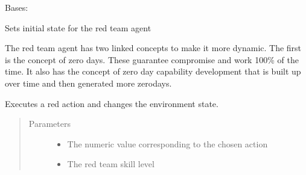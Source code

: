 \documentclass[letterpaper,10pt,english]{sphinxmanual}
\begin{document}
\begin{fulllineitems}
\label{\detokenize{source/yawning_titan.agents.static_agents:yawning_titan.agents.static_agents.fixed_red.FixedRedAgent}}
\sphinxAtStartPar
Bases: 

\sphinxAtStartPar
Sets initial state for the red team agent

\sphinxAtStartPar
The red team agent has two linked concepts to make it more dynamic. The first is the concept of
zero days. These guarantee compromise and work 100\% of the time. It also has the concept of
zero day capability development that is built up over time and then generated more zero\sphinxhyphen{}days.

\begin{fulllineitems}
\label{\detokenize{source/yawning_titan.agents.static_agents:yawning_titan.agents.static_agents.fixed_red.FixedRedAgent.do_red_action}}
\sphinxAtStartPar
Executes a red action and changes the environment state.
\begin{quote}\begin{description}
\item[{Parameters}] \leavevmode\begin{itemize}
\item {}
\sphinxAtStartPar
{} \textendash{} The numeric value corresponding to the chosen action

\item {}
\sphinxAtStartPar
{} \textendash{} The red team skill level


\end{itemize}
\end{description}
\end{quote}
\end{fulllineitems}
\end{fulllineitems}
\end{document}
